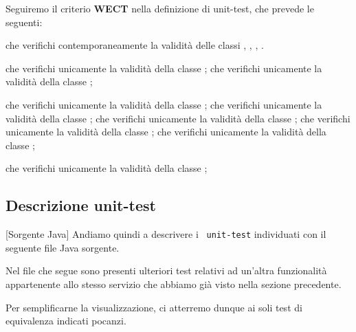Seguiremo il criterio \textbf{WECT} nella definizione di unit-test, che prevede le seguenti:
\begin{eqtest}
	 che verifichi contemporaneamente la validità delle classi , 
		, , .

	 che verifichi unicamente la validità della classe ;
	 che verifichi unicamente la validità della classe ;

	 che verifichi unicamente la validità della classe ;
	 che verifichi unicamente la validità della classe ;
	 che verifichi unicamente la validità della classe ;
	 che verifichi unicamente la validità della classe ;
	 che verifichi unicamente la validità della classe ;

	 che verifichi unicamente la validità della classe ;
\end{eqtest}

\newpage
\subsection{Descrizione unit-test}[Sorgente Java]
Andiamo quindi a descrivere i \texttt{\color{ddchaptercolor!80!black}\theenumi\ unit-test} individuati
con il seguente file Java sorgente.

\begin{warn}[Semplificazione]
	Nel file che segue sono presenti ulteriori test relativi ad un'altra funzionalità appartenente allo stesso servizio
	che abbiamo già visto nella sezione precedente. 
	\par\vspace{3mm}
	Per semplificarne la visualizzazione, ci atterremo dunque ai soli test di equivalenza indicati
	pocanzi.
\end{warn}

